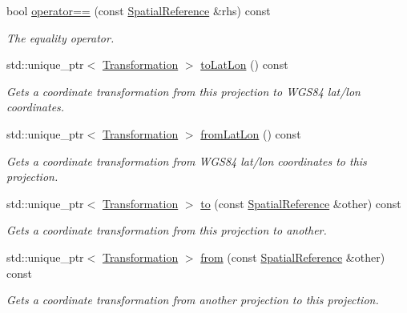 \begin{DoxyCompactItemize}
bool \hyperlink{group___imagery_module_ga447d6d2e3c69d16c90b6efe701b2d306}{operator==} (const \hyperlink{classdg_1_1deepcore_1_1geometry_1_1_spatial_reference}{Spatial\+Reference} \&rhs) const 
\begin{DoxyCompactList}\small\item\em The equality operator. \end{DoxyCompactList}\item 
std\+::unique\+\_\+ptr$<$ \hyperlink{structdg_1_1deepcore_1_1geometry_1_1_transformation}{Transformation} $>$ \hyperlink{classdg_1_1deepcore_1_1geometry_1_1_spatial_reference_a1baea411e091246c72e7f7f3023ae2e6}{to\+Lat\+Lon} () const 
\begin{DoxyCompactList}\small\item\em Gets a coordinate transformation from this projection to W\+G\+S84 lat/lon coordinates. \end{DoxyCompactList}\item 
std\+::unique\+\_\+ptr$<$ \hyperlink{structdg_1_1deepcore_1_1geometry_1_1_transformation}{Transformation} $>$ \hyperlink{classdg_1_1deepcore_1_1geometry_1_1_spatial_reference_a625240eeb6fb0ceb10524b5d84f97e82}{from\+Lat\+Lon} () const 
\begin{DoxyCompactList}\small\item\em Gets a coordinate transformation from W\+G\+S84 lat/lon coordinates to this projection. \end{DoxyCompactList}\item 
std\+::unique\+\_\+ptr$<$ \hyperlink{structdg_1_1deepcore_1_1geometry_1_1_transformation}{Transformation} $>$ \hyperlink{classdg_1_1deepcore_1_1geometry_1_1_spatial_reference_a1f43bf8053bab0b45f04dce419089673}{to} (const \hyperlink{classdg_1_1deepcore_1_1geometry_1_1_spatial_reference}{Spatial\+Reference} \&other) const 
\begin{DoxyCompactList}\small\item\em Gets a coordinate transformation from this projection to another. \end{DoxyCompactList}\item 
std\+::unique\+\_\+ptr$<$ \hyperlink{structdg_1_1deepcore_1_1geometry_1_1_transformation}{Transformation} $>$ \hyperlink{classdg_1_1deepcore_1_1geometry_1_1_spatial_reference_af1b1d35423ca07aa3775dfe46e8db4f6}{from} (const \hyperlink{classdg_1_1deepcore_1_1geometry_1_1_spatial_reference}{Spatial\+Reference} \&other) const 
\begin{DoxyCompactList}\small\item\em Gets a coordinate transformation from another projection to this projection. \end{DoxyCompactList}\end{DoxyCompactItemize}
